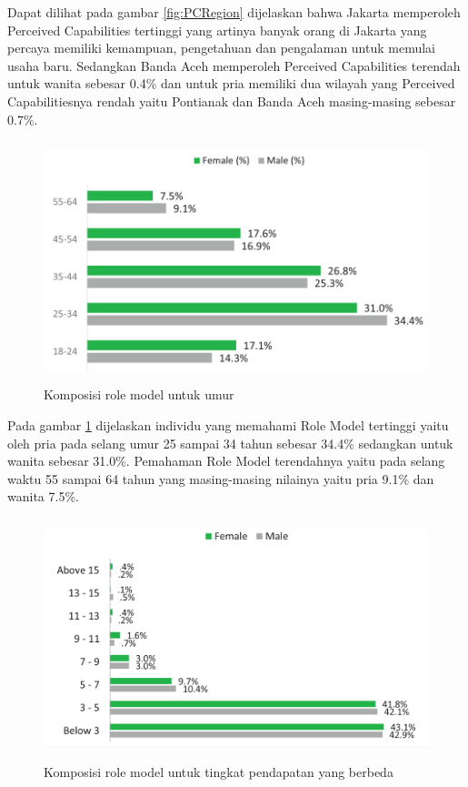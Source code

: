 Dapat dilihat pada gambar \ref{fig:PCRegion} dijelaskan bahwa Jakarta memperoleh Perceived Capabilities tertinggi yang artinya banyak orang di Jakarta yang percaya memiliki kemampuan, pengetahuan dan pengalaman untuk memulai usaha baru. Sedangkan Banda Aceh memperoleh Perceived Capabilities terendah untuk wanita sebesar 0.4\% dan untuk pria memiliki dua wilayah yang Perceived Capabilitiesnya rendah yaitu Pontianak dan Banda Aceh masing-masing sebesar 0.7\%.

\begin{figure} [H]
	\centering  
	\includegraphics[width=12cm, height=7cm]{umurRM2013} 
	\caption[Komposisi role model untuk umur]{Komposisi role model untuk umur} 
	\label{fig:RMUmur} 
\end{figure}


Pada gambar \ref{fig:RMUmur} dijelaskan individu yang memahami Role Model tertinggi yaitu oleh pria pada selang umur 25 sampai 34 tahun sebesar 34.4\% sedangkan untuk wanita sebesar 31.0\%. Pemahaman Role Model terendahnya yaitu pada selang waktu 55 sampai 64 tahun yang masing-masing nilainya yaitu pria 9.1\% dan wanita 7.5\%.


\begin{figure} [H]
	\centering  
	\includegraphics[width=13cm, height=7cm]{pendapatanRM2013} 
	\caption[Komposisi role model untuk tingkat pendapatan yang berbeda]{Komposisi role model untuk tingkat pendapatan yang berbeda} 
	\label{fig:RMpendapatan} 
\end{figure}  


